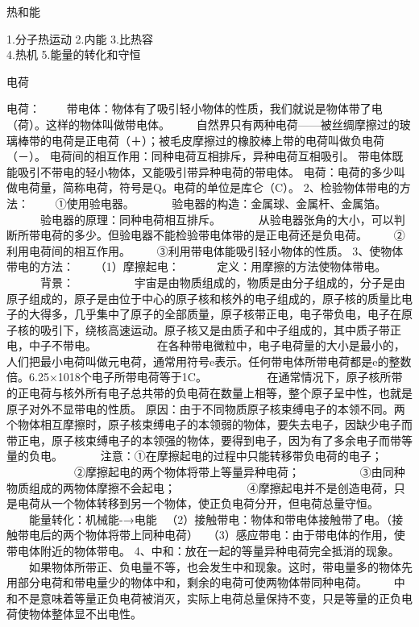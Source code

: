 \documentclass[12pt]{exam}
\newcommand{\keti}{热和能}
\newcommand{\zhongdian}{1.分子热运动 2.内能 3.比热容\\  4.热机 5.能量的转化和守恒}
\renewcommand{\section}[1]{{\large\sffamily  #1} \par}
\begin{document}
\vspace*{80pt}
\keti \par
\zhongdian \par
\section{电荷}
电荷：
　　带电体：物体有了吸引轻小物体的性质，我们就说是物体带了电（荷）。这样的物体叫做带电体。
　　自然界只有两种电荷——被丝绸摩擦过的玻璃棒带的电荷是正电荷（＋）；被毛皮摩擦过的橡胶棒上带的电荷叫做负电荷（－）。
电荷间的相互作用：同种电荷互相排斥，异种电荷互相吸引。
带电体既能吸引不带电的轻小物体，又能吸引带异种电荷的带电体。
电荷：电荷的多少叫做电荷量，简称电荷，符号是Q。电荷的单位是库仑（C）。
2、检验物体带电的方法：
　　①使用验电器。
　　　验电器的构造：金属球、金属杆、金属箔。
　　　验电器的原理：同种电荷相互排斥。
　　　从验电器张角的大小，可以判断所带电荷的多少。但验电器不能检验带电体带的是正电荷还是负电荷。
　　②利用电荷间的相互作用。
　　③利用带电体能吸引轻小物体的性质。
3、使物体带电的方法：
　　（1）摩擦起电：
　　　定义：用摩擦的方法使物体带电。
　　　背景：
　　　　　宇宙是由物质组成的，物质是由分子组成的，分子是由原子组成的，原子是由位于中心的原子核和核外的电子组成的，原子核的质量比电子的大得多，几乎集中了原子的全部质量，原子核带正电，电子带负电，电子在原子核的吸引下，绕核高速运动。原子核又是由质子和中子组成的，其中质子带正电，中子不带电。
　　　　　在各种带电微粒中，电子电荷量的大小是最小的，人们把最小电荷叫做元电荷，通常用符号e表示。任何带电体所带电荷都是e的整数倍。6.25×1018个电子所带电荷等于1C。
　　　　　在通常情况下，原子核所带的正电荷与核外所有电子总共带的负电荷在数量上相等，整个原子呈中性，也就是原子对外不显带电的性质。
    原因：由于不同物质原子核束缚电子的本领不同。两个物体相互摩擦时，原子核束缚电子的本领弱的物体，要失去电子，因缺少电子而带正电，原子核束缚电子的本领强的物体，要得到电子，因为有了多余电子而带等量的负电。
　　　注意：①在摩擦起电的过程中只能转移带负电荷的电子；
　　　　　　②摩擦起电的两个物体将带上等量异种电荷；
　　　　　③由同种物质组成的两物体摩擦不会起电；
　　　　　　④摩擦起电并不是创造电荷，只是电荷从一个物体转移到另一个物体，使正负电荷分开，但电荷总量守恒。
　　能量转化：机械能-→电能
　（2）接触带电：物体和带电体接触带了电。（接触带电后的两个物体将带上同种电荷）
　（3）感应带电：由于带电体的作用，使带电体附近的物体带电。
4、中和：放在一起的等量异种电荷完全抵消的现象。
　　如果物体所带正、负电量不等，也会发生中和现象。这时，带电量多的物体先用部分电荷和带电量少的物体中和，剩余的电荷可使两物体带同种电荷。
　　中和不是意味着等量正负电荷被消灭，实际上电荷总量保持不变，只是等量的正负电荷使物体整体显不出电性。
\end{document}
